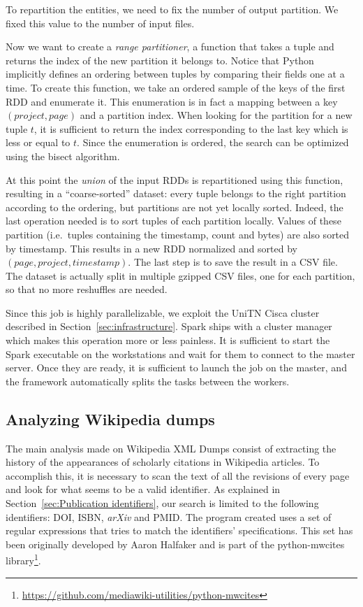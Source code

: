 To repartition the entities, we need to fix the number of output partition.
We fixed this value to the number of input files.

Now we want to create a \emph{range partitioner}, a function that takes a tuple and returns the index of the new partition it belongs to.
Notice that Python implicitly defines an ordering between tuples by comparing their fields one at a time.
To create this function, we take an ordered sample of the keys of the first \ac{RDD} and enumerate it.
This enumeration is in fact a mapping between a key $(project, page)$ and a partition index.
When looking for the partition for a new tuple $t$, it is sufficient to return the index corresponding to the last key which is less or equal to $t$.
Since the enumeration is ordered, the search can be optimized using the bisect algorithm.

At this point the \emph{union} of the input \acp{RDD} is repartitioned using this function, resulting in a ``coarse-sorted'' dataset: every tuple belongs to the right partition according to the ordering, but partitions are not yet locally sorted.
Indeed, the last operation needed is to sort tuples of each partition locally.
Values of these partition (i.e.\ tuples containing the timestamp, count and bytes) are also sorted by timestamp.
This results in a new \ac{RDD} normalized and sorted by $(page, project, timestamp)$.
The last step is to save the result in a CSV file.
The dataset is actually split in multiple gzipped CSV files, one for each partition, so that no more reshuffles are needed.

Since this job is highly parallelizable, we exploit the UniTN Cisca cluster described in Section~\ref{sec:infrastructure}.
Spark ships with a cluster manager which makes this operation more or less painless.
It is sufficient to start the Spark executable on the workstations and wait for them to connect to the master server.
Once they are ready, it is sufficient to launch the job on the master, and the framework automatically splits the tasks between the workers.

\subsection{Analyzing Wikipedia dumps}
\label{sub:Analyzing Wikipedia dumps}
The main analysis made on Wikipedia XML Dumps consist of extracting the history of the appearances of scholarly citations in Wikipedia articles.
To accomplish this, it is necessary to scan the text of all the revisions of every page and look for what seems to be a valid identifier.
As explained in Section~\ref{sec:Publication identifiers}, our search is limited to the following identifiers: \ac{DOI}, \ac{ISBN}, \emph{arXiv} and \ac{PMID}.
The program created uses a set of regular expressions that tries to match the identifiers' specifications.
This set has been originally developed by Aaron Halfaker and is part of the python-mwcites library\footnote{\url{https://github.com/mediawiki-utilities/python-mwcites}}.

